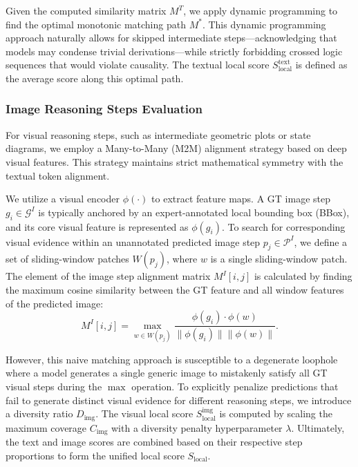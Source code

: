 \documentclass[11pt]{article}
\begin{document}
Given the computed similarity matrix $M^T$, we apply dynamic programming to find the optimal monotonic matching path $M^*$. This dynamic programming approach naturally allows for skipped intermediate steps---acknowledging that models may condense trivial derivations---while strictly forbidding crossed logic sequences that would violate causality. The textual local score $S_{\text{local}}^{\text{text}}$ is defined as the average score along this optimal path.

\subsubsection{\textbf{Image Reasoning Steps Evaluation}}
\label{sec:eval_image}

For visual reasoning steps, such as intermediate geometric plots or state diagrams, we employ a Many-to-Many (M2M) alignment strategy based on deep visual features. This strategy maintains strict mathematical symmetry with the textual token alignment.

We utilize a visual encoder $\phi(\cdot)$ to extract feature maps. A GT image step $g_i \in \mathcal{G}^I$ is typically anchored by an expert-annotated local bounding box (BBox), and its core visual feature is represented as $\phi(g_i)$. To search for corresponding visual evidence within an unannotated predicted image step $p_j \in \mathcal{P}^I$, we define a set of sliding-window patches $W(p_j)$, where $w$ is a single sliding-window patch. The element of the image step alignment matrix $M^I[i,j]$ is calculated by finding the maximum cosine similarity between the GT feature and all window features of the predicted image:
\begin{equation}
M^I[i,j] = \max_{w \in W(p_j)} \frac{\phi(g_i) \cdot \phi(w)}{\|\phi(g_i)\| \|\phi(w)\|}.
\end{equation}

However, this naive matching approach is susceptible to a degenerate loophole where a model generates a single generic image to mistakenly satisfy all GT visual steps during the $\max$ operation. To explicitly penalize predictions that fail to generate distinct visual evidence for different reasoning steps, we introduce a diversity ratio $D_{\text{img}}$. The visual local score $S_{\text{local}}^{\text{img}}$ is computed by scaling the maximum coverage $C_{\text{img}}$ with a diversity penalty hyperparameter $\lambda$. Ultimately, the text and image scores are combined based on their respective step proportions to form the unified local score $S_{\text{local}}$.
\end{document}
